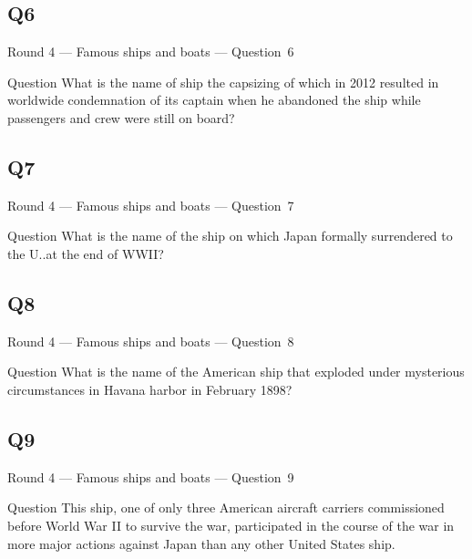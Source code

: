 \documentclass[11pt]{beamer}
\begin{document}
\subsection*{Q6}
\begin{frame}[t]{Round 4 --- Famous ships and boats --- \mbox{Question 6}}
\vspace{-0.5em}
\begin{block}{Question}
What is the name of ship the capsizing of which in  2012 resulted in worldwide condemnation of its captain when he abandoned the ship while passengers and crew were still on board?
\end{block}
\end{frame}
\subsection*{Q7}
\begin{frame}[t]{Round 4 --- Famous ships and boats --- \mbox{Question 7}}
\vspace{-0.5em}
\begin{block}{Question}
What is the name of the ship on which Japan formally surrendered to the U.\@S.\@ at the end of WWII\@?
\end{block}
\end{frame}
\subsection*{Q8}
\begin{frame}[t]{Round 4 --- Famous ships and boats --- \mbox{Question 8}}
\vspace{-0.5em}
\begin{block}{Question}
What is the name of the  American ship that exploded under mysterious circumstances in Havana harbor in February 1898? 
\end{block}
\end{frame}
\subsection*{Q9}
\begin{frame}[t]{Round 4 --- Famous ships and boats --- \mbox{Question 9}}
\vspace{-0.5em}
\begin{block}{Question}
This ship, one of only three American aircraft carriers commissioned before World War II to survive the war, participated in the course of the war in more major actions against Japan than any other United States ship.
\end{block}
\end{frame}
\end{document}
